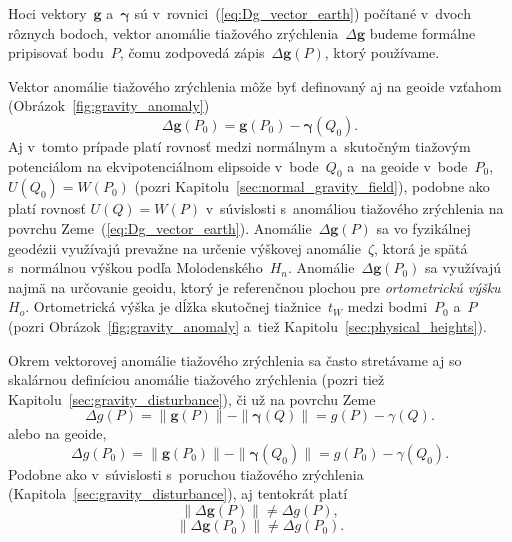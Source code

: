 \documentclass[a4paper,12pt]{book}
\let\vec\mathbf
\begin{document}
Hoci vektory~$\vec g$ a~$\boldsymbol\gamma$ sú 
v~rovnici~(\ref{eq:Dg_vector_earth}) počítané v~dvoch rôznych bodoch, vektor 
anomálie tiažového zrýchlenia~$\Delta \vec g$ budeme formálne pripisovať 
bodu~$P$, čomu zodpovedá zápis~$\Delta \vec g(P)$, ktorý používame.

Vektor anomálie tiažového zrýchlenia môže byť definovaný aj na geoide vzťahom 
(Obrázok~\ref{fig:gravity_anomaly})
%
\begin{equation}
\label{eq:Dg_vector_geoid}
\Delta \vec g(P_0) = \vec g(P_0) - \boldsymbol\gamma(Q_0){.}
\end{equation}
%
Aj v~tomto prípade platí rovnosť medzi normálnym a~skutočným tiažovým 
potenciálom na ekvipotenciálnom elipsoide v~bode~$Q_0$ a~na geoide 
v~bode~$P_0$, $U(Q_0) = W(P_0)$ (pozri 
Kapitolu~\ref{sec:normal_gravity_field}), podobne ako platí rovnosť $U(Q) 
= W(P)$ v~súvislosti s~anomáliou tiažového zrýchlenia na povrchu 
Zeme~(\ref{eq:Dg_vector_earth}).  Anomálie~$\Delta \vec g(P)$ sa vo fyzikálnej 
geodézii využívajú prevažne na určenie výškovej anomálie~$\zeta$, ktorá je 
spätá s~normálnou výškou podľa Molodenského~$H_n$.  Anomálie~$\Delta \vec 
g(P_0)$ sa využívajú najmä na určovanie geoidu, ktorý je referenčnou plochou 
pre \emph{ortometrickú výšku}~$H_o$.  Ortometrická výška je dĺžka skutočnej 
tiažnice~$t_W$ medzi bodmi~$P_0$ a~$P$ (pozri Obrázok~\ref{fig:gravity_anomaly} 
a~tiež Kapitolu~\ref{sec:physical_heights}).

Okrem vektorovej anomálie tiažového zrýchlenia sa často stretávame aj so 
skalárnou definíciou anomálie tiažového zrýchlenia (pozri tiež 
Kapitolu~\ref{sec:gravity_disturbance}), či už na povrchu Zeme
%
\begin{equation}
\label{eq:Dg_scalar_earth}
\Delta g(P) = \| \vec g(P) \| - \| \boldsymbol \gamma (Q) \| = g(P) 
- \gamma(Q){.}
\end{equation}
%
alebo na geoide,
%
\begin{equation}
\label{eq:Dg_scalar_geoid}
\Delta g(P_0) = \| \vec g(P_0) \| - \| \boldsymbol \gamma (Q_0) \| = g(P_0) 
- \gamma(Q_0){.}
\end{equation}
%
Podobne ako v~súvislosti s~poruchou tiažového zrýchlenia 
(Kapitola~\ref{sec:gravity_disturbance}), aj tentokrát platí
%
\begin{equation}
\| \Delta \vec g(P) \| \neq \Delta g(P){,}
\end{equation}
%
\begin{equation}
\| \Delta \vec g(P_0) \| \neq \Delta g(P_0){.}
\end{equation}
\end{document}
